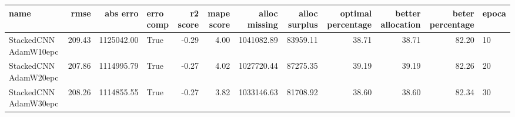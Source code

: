 \begin{tabular}{lrrlrrrrrrrl}
\toprule
name & rmse & abs erro & erro comp & r2 score & mape score & alloc missing & alloc surplus & optimal percentage & better allocation & beter percentage & epoca \\
\midrule
StackedCNN AdamW10epc & 209.43 & 1125042.00 & True & -0.29 & 4.00 & 1041082.89 & 83959.11 & 38.71 & 38.71 & 82.20 & 10 \\
StackedCNN AdamW20epc & 207.86 & 1114995.79 & True & -0.27 & 4.02 & 1027720.44 & 87275.35 & 39.19 & 39.19 & 82.26 & 20 \\
StackedCNN AdamW30epc & 208.26 & 1114855.55 & True & -0.27 & 3.82 & 1033146.63 & 81708.92 & 38.60 & 38.60 & 82.34 & 30 \\
\bottomrule
\end{tabular}
